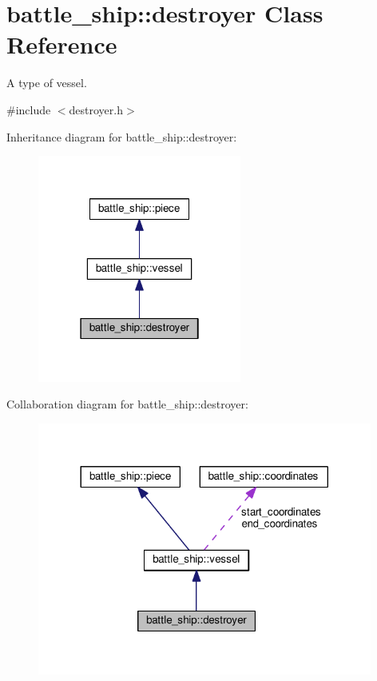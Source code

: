 \hypertarget{classbattle__ship_1_1destroyer}{}\section{battle\+\_\+ship\+:\+:destroyer Class Reference}
\label{classbattle__ship_1_1destroyer}


A type of vessel.  




{\ttfamily \#include $<$destroyer.\+h$>$}



Inheritance diagram for battle\+\_\+ship\+:\+:destroyer\+:
\nopagebreak
\begin{figure}[H]
\begin{center}
\leavevmode
\includegraphics[width=190pt]{classbattle__ship_1_1destroyer__inherit__graph}
\end{center}
\end{figure}


Collaboration diagram for battle\+\_\+ship\+:\+:destroyer\+:
\nopagebreak
\begin{figure}[H]
\begin{center}
\leavevmode
\includegraphics[width=312pt]{classbattle__ship_1_1destroyer__coll__graph}
\end{center}
\end{figure}
